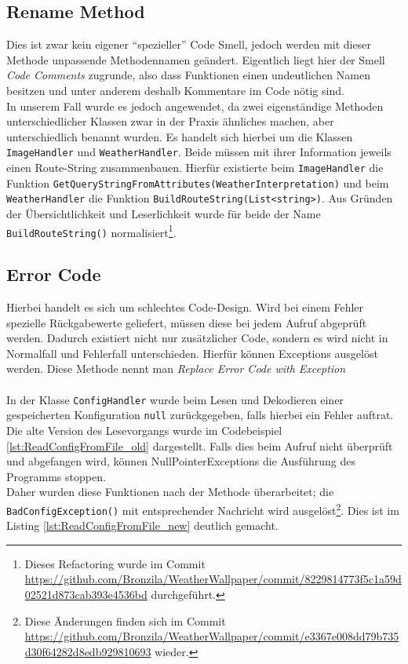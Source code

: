 \subsection{Rename Method}
Dies ist zwar kein eigener \enquote{spezieller} Code Smell, jedoch werden mit dieser Methode unpassende Methodennamen geändert.
Eigentlich liegt hier der Smell \textit{Code Comments} zugrunde, also dass Funktionen einen undeutlichen Namen besitzen und unter anderem deshalb Kommentare im Code nötig sind.\\
In unserem Fall wurde es jedoch angewendet, da zwei eigenständige Methoden unterschiedlicher Klassen zwar in der Praxis ähnliches machen, aber unterschiedlich benannt wurden.
Es handelt sich hierbei um die Klassen \texttt{ImageHandler} und \texttt{WeatherHandler}.
Beide müssen mit ihrer Information jeweils einen Route-String zusammenbauen.
Hierfür existierte beim \texttt{ImageHandler} die Funktion \texttt{GetQueryStringFromAttributes(WeatherInterpretation)} und beim \texttt{WeatherHandler} die Funktion \texttt{BuildRouteString(List<string>)}.
Aus Gründen der Übersichtlichkeit und Leserlichkeit wurde für beide der Name \texttt{BuildRouteString()} normalisiert\footnote{Dieses Refactoring wurde im Commit \url{https://github.com/Bronzila/WeatherWallpaper/commit/8229814773f5c1a59d02521d873cab393e4536bd} durchgeführt.}.

\subsection{Error Code}
Hierbei handelt es sich um schlechtes Code-Design. 
Wird bei einem Fehler spezielle Rückgabewerte geliefert, müssen diese bei jedem Aufruf abgeprüft werden.
Dadurch existiert nicht nur zusätzlicher Code, sondern es wird nicht in Normalfall und Fehlerfall unterschieden.
Hierfür können Exceptions ausgelöst werden.
Diese Methode nennt man \textit{Replace Error Code with Exception}\\
\\
In der Klasse \texttt{ConfigHandler} wurde beim Lesen und Dekodieren einer gespeicherten Konfiguration \texttt{null} zurückgegeben, falls hierbei ein Fehler auftrat. 
Die alte Version des Lesevorgangs wurde im Codebeispiel \ref{lst:ReadConfigFromFile_old} dargestellt.
Falls dies beim Aufruf nicht überprüft und abgefangen wird, können NullPointerExceptions die Ausführung des Programms stoppen.\\
Daher wurden diese Funktionen nach der Methode überarbeitet; die \texttt{BadConfigException()} mit entsprechender Nachricht wird ausgelöst\footnote{Diese Änderungen finden sich im Commit \url{https://github.com/Bronzila/WeatherWallpaper/commit/e3367e008dd79b735d30f64282d8edb929810693} wieder.}.
Dies ist im Listing \ref{lst:ReadConfigFromFile_new} deutlich gemacht.

